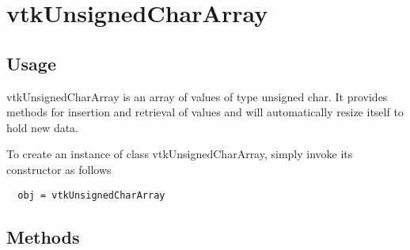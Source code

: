 \section{vtkUnsignedCharArray}

\subsection{Usage}

 vtkUnsignedCharArray is an array of values of type unsigned char.
 It provides methods for insertion and retrieval of values and will
 automatically resize itself to hold new data.

To create an instance of class vtkUnsignedCharArray, simply
invoke its constructor as follows
\begin{verbatim}
  obj = vtkUnsignedCharArray
\end{verbatim}
\subsection{Methods}

